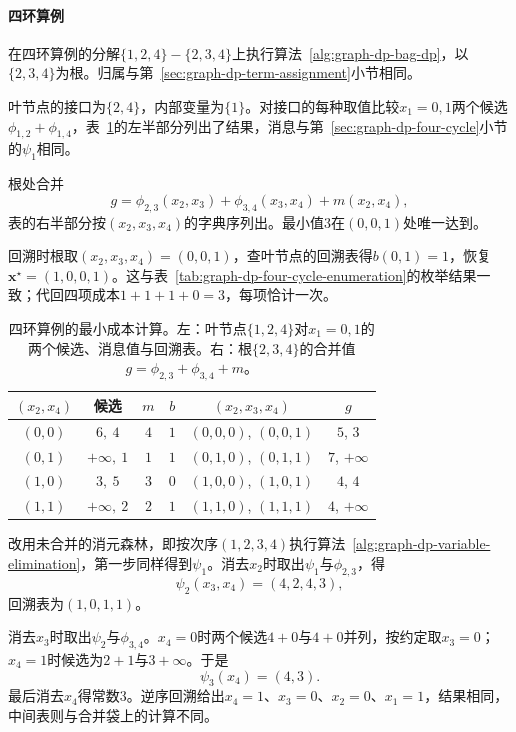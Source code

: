 \paragraph{四环算例}
在四环算例的分解$\{1,2,4\}-\{2,3,4\}$上执行算法~\ref{alg:graph-dp-bag-dp}，以$\{2,3,4\}$为根。归属与第~\ref{sec:graph-dp-term-assignment}小节相同。

叶节点的接口为$\{2,4\}$，内部变量为$\{1\}$。对接口的每种取值比较$x_1=0,1$两个候选$\phi_{1,2}+\phi_{1,4}$，表~\ref{tab:graph-dp-four-cycle-min-messages}的左半部分列出了结果，消息与第~\ref{sec:graph-dp-four-cycle}小节的$\psi_1$相同。

根处合并
\[
g=\phi_{2,3}(x_2,x_3)+\phi_{3,4}(x_3,x_4)+m(x_2,x_4),
\]
表的右半部分按$(x_2,x_3,x_4)$的字典序列出。最小值$3$在$(0,0,1)$处唯一达到。

回溯时根取$(x_2,x_3,x_4)=(0,0,1)$，查叶节点的回溯表得$b(0,1)=1$，恢复$\bm x^\star=(1,0,0,1)$。这与表~\ref{tab:graph-dp-four-cycle-enumeration}的枚举结果一致；代回四项成本$1+1+1+0=3$，每项恰计一次。

\begin{table}[!htb]
  \centering
  \small
  \begin{tabular}{@{}cccc@{\qquad}cc@{}}
    \toprule
    $(x_2,x_4)$ & 候选 & $m$ & $b$ & $(x_2,x_3,x_4)$ & $g$\\
    \midrule
    $(0,0)$ & $6,\ 4$ & $4$ & $1$ & $(0,0,0)$, $(0,0,1)$ & $5$, $3$\\
    $(0,1)$ & $+\infty,\ 1$ & $1$ & $1$ & $(0,1,0)$, $(0,1,1)$ & $7$, $+\infty$\\
    $(1,0)$ & $3,\ 5$ & $3$ & $0$ & $(1,0,0)$, $(1,0,1)$ & $4$, $4$\\
    $(1,1)$ & $+\infty,\ 2$ & $2$ & $1$ & $(1,1,0)$, $(1,1,1)$ & $4$, $+\infty$\\
    \bottomrule
  \end{tabular}
  \caption{四环算例的最小成本计算。左：叶节点$\{1,2,4\}$对$x_1=0,1$的两个候选、消息值与回溯表。右：根$\{2,3,4\}$的合并值$g=\phi_{2,3}+\phi_{3,4}+m$。}
  \label{tab:graph-dp-four-cycle-min-messages}
\end{table}

改用未合并的消元森林，即按次序$(1,2,3,4)$执行算法~\ref{alg:graph-dp-variable-elimination}，第一步同样得到$\psi_1$。消去$x_2$时取出$\psi_1$与$\phi_{2,3}$，得
\[
\psi_2(x_3,x_4)=(4,2,4,3),
\]
回溯表为$(1,0,1,1)$。

消去$x_3$时取出$\psi_2$与$\phi_{3,4}$。$x_4=0$时两个候选$4+0$与$4+0$并列，按约定取$x_3=0$；$x_4=1$时候选为$2+1$与$3+\infty$。于是
\[
\psi_3(x_4)=(4,3).
\]
最后消去$x_4$得常数$3$。逆序回溯给出$x_4=1$、$x_3=0$、$x_2=0$、$x_1=1$，结果相同，中间表则与合并袋上的计算不同。

